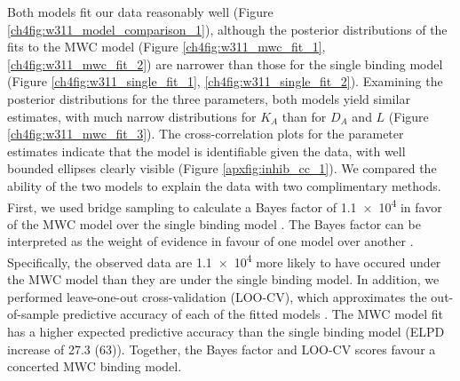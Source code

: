 Both models fit our data reasonably well (Figure \ref{ch4fig:w311_model_comparison_1}), although the posterior distributions of the fits to the MWC model (Figure \ref{ch4fig:w311_mwc_fit_1}, \ref{ch4fig:w311_mwc_fit_2}) are narrower than those for the single binding model (Figure \ref{ch4fig:w311_single_fit_1}, \ref{ch4fig:w311_single_fit_2}).
Examining the posterior distributions for the three parameters, both models yield similar estimates, with much narrow distributions for $K_A$ than for $D_A$ and $L$ (Figure \ref{ch4fig:w311_mwc_fit_3}).
The cross-correlation plots for the parameter estimates indicate that the model is identifiable given the data, with well bounded ellipses clearly visible (Figure \ref{apxfig:inhib_cc_1}).
We compared the ability of the two models to explain the data with two complimentary methods.
First, we used bridge sampling to calculate a Bayes factor of \num{1.1e4} in favor of the MWC model over the single binding model \cite{gronau_bridgesampling_2020}.
The Bayes factor can be interpreted as the weight of evidence in favour of one model over another \cite{wagenmakers_practical_2007}.
Specifically, the observed data are \num{1.1e4} more likely to have occured under the MWC model than they are under the single binding model.
In addition, we performed leave-one-out cross-validation (LOO-CV), which approximates the out-of-sample predictive accuracy of each of the fitted models \cite{vehtari_practical_2017}.
The MWC model fit has a higher expected predictive accuracy than the single binding model (ELPD increase of \num{27.3 (63)}).
Together, the Bayes factor and LOO-CV scores favour a concerted MWC binding model.

